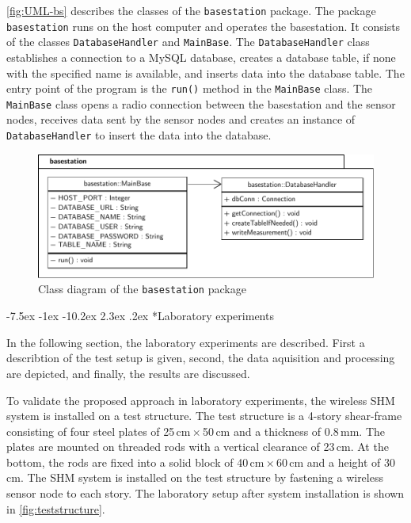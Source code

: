 \documentclass[12pt,a4paper]{scrartcl}
\makeatletter
\renewcommand\section{\@startsection{section}{1}{\z@}%
                     {-7.5ex \@plus -1ex \@minus -10.2ex}%
                     {2.3ex \@plus.2ex}%
                     {\sffamily\large\bfseries}}
\makeatother
\begin{document}
\autoref{fig:UML-bs} describes the classes of the \texttt{base\-station} package.
The package \texttt{base\-station} runs on the host computer and operates the basestation.
It consists of the classes \texttt{Database\-Handler} and \texttt{Main\-Base}.
The \texttt{Database\-Handler} class establishes a connection to a MySQL database, creates a database table, if none with the specified name is available, and inserts data into the database table.
The entry point of the program is the \texttt{run()} method in the \texttt{Main\-Base} class. The \texttt{Main\-Base} class opens a radio connection between the basestation and the sensor nodes, receives data sent by the sensor nodes and creates an instance of \texttt{Database\-Handler} to insert the data into the database.

\begin{figure}[h!]
    \centering
    \includegraphics[width = \textwidth]{figures/uml-basestation.pdf}
    \caption{Class diagram of the \texttt{basestation} package}
    \label{fig:UML-bs}
\end{figure}



\section*{Laboratory experiments}

In the following section, the laboratory experiments are described.
First a describtion of the test setup is given, second, the data aquisition and processing are depicted, and finally, the results are discussed. 

To validate the proposed approach in laboratory experiments, the wireless SHM system is installed on a test structure.
The test structure is a 4-story shear-frame consisting of four steel plates of 25\,cm\,$\times$\,50\,cm and a thickness of 0.8\,mm.
The plates are mounted on threaded rods with a vertical clearance of 23\,cm.
At the bottom, the rods are fixed into a solid block of 40\,cm\,$\times$\,60\,cm and a height of 30\,cm.
The SHM system is installed on the test structure by fastening a wireless sensor node to each story.
The laboratory setup after system installation is shown in \autoref{fig:teststructure}.
\end{document}
